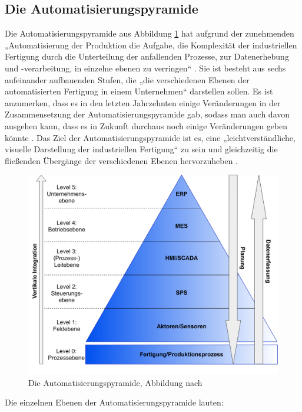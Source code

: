 \subsection{Die Automatisierungspyramide}\label{sec:Automatisierungspyramide}
Die Automatisierungspyramide aus Abbildung \ref{fig:Automatisierungspyramide} hat aufgrund der zunehmenden „Automatisierung der Produktion die Aufgabe, die Komplexität der industriellen Fertigung durch die Unterteilung der anfallenden Prozesse, zur Datenerhebung und -verarbeitung, in einzelne ebenen zu verringen“ \cite[S.49]{14}. Sie ist besteht aus sechs aufeinander aufbauenden Stufen, die „die verschiedenen Ebenen der automatisierten Fertigung in einem Unternehmen“ \cite[S.49]{14} darstellen sollen. Es ist anzumerken, dass es in den letzten Jahrzehnten einige Veränderungen in der Zusammensetzung der Automatisierungspyramide gab, sodass man auch davon ausgehen kann, dass es in Zukunft durchaus noch einige Veränderungen geben könnte \cite[S.49]{14}. Das Ziel der Automatisierungspyramide ist es, eine „leichtverständliche, visuelle Darstellung der industriellen Fertigung“ \cite[S.49]{14} zu sein und gleichzeitig die fließenden Übergänge der verschiedenen Ebenen hervorzuheben \cite[S.49]{14}.
\newpage
\begin{figure}[h]
	\centering
	\includegraphics[width=0.8\linewidth]{Bilder/A9_Automatisierungspyramide}
	\caption{Die Automatisierungspyramide, Abbildung nach \cite[S.49]{14}}
	\label{fig:Automatisierungspyramide}
\end{figure}
\noindent Die einzelnen Ebenen der Automatisierungspyramide lauten:
